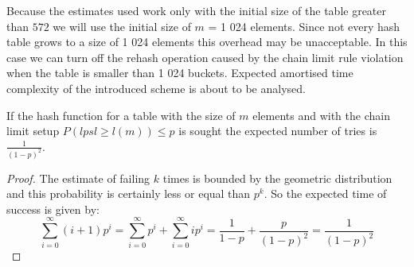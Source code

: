 Because the estimates used work only with the initial size of the table greater than $572$ we will use the initial size of $m$ = 1 024 elements. Since not every hash table grows to a size of 1 024 elements this overhead may be unacceptable. In this case we can turn off the rehash operation caused by the chain limit rule violation when the table is smaller than 1 024 buckets. Expected amortised time complexity of the introduced scheme is about to be analysed.

\begin{lemma}
\label{lemma-linear-transformations-tries}
If the hash function for a table with the size of $m$ elements and with the chain limit setup $P(lpsl \geq l(m)) \leq p$ is sought the expected number of tries is $\frac{1}{(1 - p)^2}$.
\end{lemma}
\begin{proof}
The estimate of failing $k$ times is bounded by the geometric distribution and this probability is certainly less or equal than $p^k$. So the expected time of success is given by:
\begin{displaymath}
\sum_{i = 0}^{\infty} (i + 1)p^i = \sum_{i = 0}^{\infty}p^i + \sum_{i = 0}^{\infty}ip^i = \frac{1}{1 - p} + \frac{p}{(1- p)^2} = \frac{1}{(1 - p)^2}
\end{displaymath}
\end{proof}

